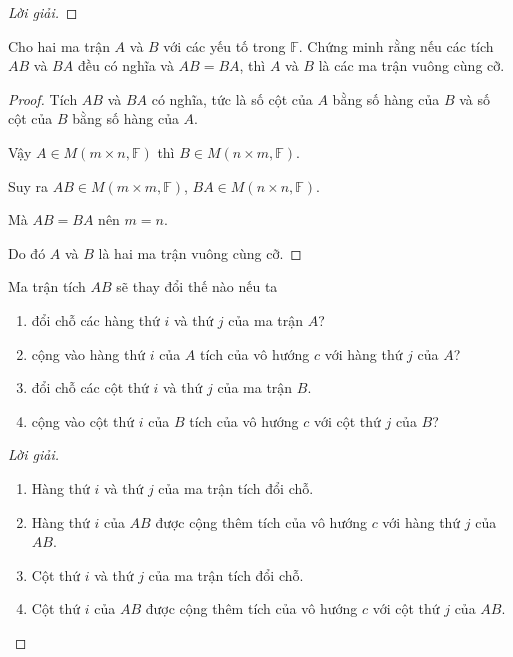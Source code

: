 \documentclass[class=linearalgebra,crop=false]{standalone}
\begin{document}
\begin{proof}[Lời giải]
\end{proof}

\begin{exercise}
    Cho hai ma trận $A$ và $B$ với các yếu tố trong $\mathbb{F}$. Chứng minh rằng nếu các tích $AB$ và $BA$ đều có nghĩa và $AB = BA$, thì $A$ và $B$ là các ma trận vuông cùng cỡ.
\end{exercise}

\begin{proof}
    Tích $AB$ và $BA$ có nghĩa, tức là số cột của $A$ bằng số hàng của $B$ và số cột của $B$ bằng số hàng của $A$.
    \par Vậy $A\in M(m\times n,\mathbb{F})$ thì $B\in M(n\times m, \mathbb{F})$.
    \par Suy ra $AB\in M(m\times m,\mathbb{F})$, $BA\in M(n\times n,\mathbb{F})$.
    \par Mà $AB = BA$ nên $m = n$.
    \par Do đó $A$ và $B$ là hai ma trận vuông cùng cỡ.
\end{proof}

\begin{exercise}
    Ma trận tích $AB$ sẽ thay đổi thế nào nếu ta
    \begin{enumerate}[label = (\alph*)]
        \item đổi chỗ các hàng thứ $i$ và thứ $j$ của ma trận $A$?
        \item cộng vào hàng thứ $i$ của $A$ tích của vô hướng $c$ với hàng thứ $j$ của $A$?
        \item đổi chỗ các cột thứ $i$ và thứ $j$ của ma trận $B$.
        \item cộng vào cột thứ $i$ của $B$ tích của vô hướng $c$ với cột thứ $j$ của $B$?
    \end{enumerate}
\end{exercise}

\begin{proof}[Lời giải]
    \begin{enumerate}[label = (\alph*)]
        \item Hàng thứ $i$ và thứ $j$ của ma trận tích đổi chỗ.
        \item Hàng thứ $i$ của $AB$ được cộng thêm tích của vô hướng $c$ với hàng thứ $j$ của $AB$.
        \item Cột thứ $i$ và thứ $j$ của ma trận tích đổi chỗ.
        \item Cột thứ $i$ của $AB$ được cộng thêm tích của vô hướng $c$ với cột thứ $j$ của $AB$.
    \end{enumerate}
\end{proof}
\end{document}
